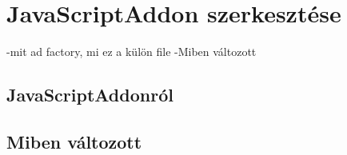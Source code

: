 \chapter*{JavaScriptAddon szerkesztése}
-mit ad factory, mi ez a külön file
-Miben változott

\section{JavaScriptAddonról}

\section{Miben változott}
